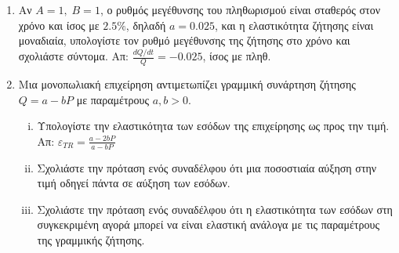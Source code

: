 \begin{enumerate}
  \item Αν $ A=1, \; B=1 $, ο ρυθμός μεγέθυνσης του πληθωρισμού είναι σταθερός στον
    χρόνο και ίσος με $ 2.5\% $, δηλαδή $ a=0.025 $, και η ελαστικότητα ζήτησης είναι
    μοναδιαία, υπολογίστε τον ρυθμό μεγέθυνσης της ζήτησης στο χρόνο και σχολιάστε
    σύντομα. 
    \hfill Απ: $ \frac{dQ/dt}{Q} = -0.025 $, ίσος με πληθ. 
  \item Μια μονοπωλιακή επιχείρηση αντιμετωπίζει γραμμική συνάρτηση ζήτησης $ Q = a-bP $ 
    με παραμέτρους $ a,b>0 $. 
    \begin{enumerate}[i)]
      \item Υπολογίστε την ελαστικότητα των εσόδων της επιχείρησης ως
        προς την τιμή.
        \hfill Απ: $ \varepsilon _{TR} = \frac{a-2bP}{a-bP} $ 
      \item Σχολιάστε την πρόταση ενός συναδέλφου ότι μια ποσοστιαία αύξηση στην τιμή
        οδηγεί πάντα σε αύξηση των εσόδων.
      \item Σχολιάστε την πρόταση ενός συναδέλφου ότι η ελαστικότητα των εσόδων στη
        συγκεκριμένη αγορά μπορεί να είναι ελαστική ανάλογα με τις παραμέτρους της
        γραμμικής ζήτησης.
    \end{enumerate}
\end{enumerate}



